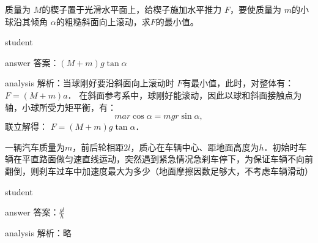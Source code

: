 \begin{example}
	 质量为 $ M $的楔子置于光滑水平面上，给楔子施加水平推力 $ F $，要使质量为 $ m $的小球沿其倾角 $ \alpha $的粗糙斜面向上滚动，求$ F $的最小值。
	
	\begin{taggedblock}{student}
		\vspace*{1cm}
	\end{taggedblock}
	
	
	\begin{taggedblock}{answer}
		答案：$ (M+m)g\tan\alpha $
	\end{taggedblock}
	
	
	\begin{taggedblock}{analysis}
		解析：当球刚好要沿斜面向上滚动时 $ F $有最小值，此时，对整体有： $ F=(M+m)a $．
		在斜面参考系中，球刚好能滚动，因此以球和斜面接触点为轴，小球所受力矩平衡，有： 
		\[
		mar\cos\alpha = mgr\sin\alpha,
		\]
	联立解得： $F=(M+m)g\tan\alpha⁡$．
		
	\end{taggedblock}
\end{example}


\begin{example}
	 一辆汽车质量为$ m $，前后轮相距$ 2l $，质心在车辆中心、距地面高度为$ h $．初始时车辆在平直路面做匀速直线运动，突然遇到紧急情况急刹车停下，为保证车辆不向前翻倒，则刹车过车中加速度最大为多少（地面摩擦因数足够大，不考虑车辆滑动）
	
	\begin{taggedblock}{student}
		\vspace*{2cm}
	\end{taggedblock}
	
	
	\begin{taggedblock}{answer}
		答案：$\frac{gl}{h}$
	\end{taggedblock}
	
	
	\begin{taggedblock}{analysis}
		解析：略
	\end{taggedblock}
\end{example}



